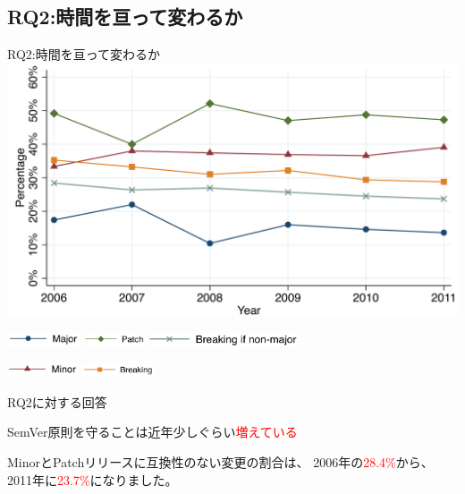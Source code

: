 \subsection{RQ2:時間を亘って変わるか}
\begin{frame}{RQ2:時間を亘って変わるか}
\includegraphics[width=\textwidth]{figure5a}

\includegraphics[height=1.1em]{figure5b}
\includegraphics[height=1.1em]{figure5c}
\includegraphics[height=1.1em]{figure5d}

\includegraphics[height=1.1em]{figure5e}
\includegraphics[height=1.1em]{figure5f}
\end{frame}
\begin{frame}{RQ2に対する回答}

{\Huge
SemVer原則を守ることは近年少しぐらい\textcolor{red}{増えている}
}

\pause\vspace{1em}

{\Large
MinorとPatchリリースに互換性のない変更の割合は、
2006年の\textcolor{red}{28.4\%}から、2011年に\textcolor{red}{23.7\%}になりました。
}

\end{frame}
